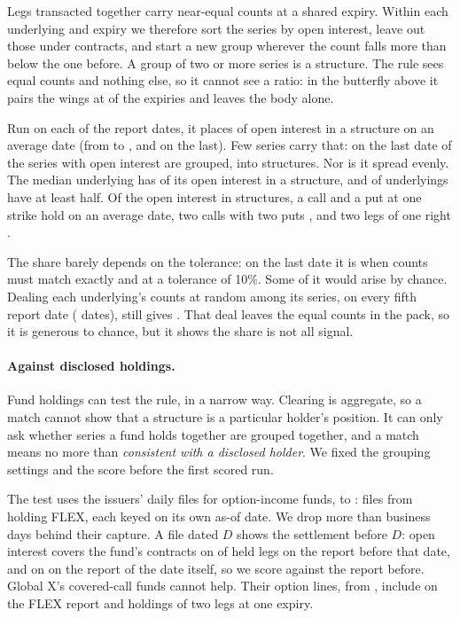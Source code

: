 \documentclass[11pt]{article}
\begin{document}
Legs transacted together carry near-equal counts at a shared expiry. Within each underlying
and expiry we therefore sort the series by open interest, leave out those under
\PosMinContracts{} contracts, and start a new group wherever the count falls more than
\PosTolerance{} below the one before. A group of two or more series is a structure. The rule
sees equal counts and nothing else, so it cannot see a ratio: in the butterfly above it pairs
the wings at \PosButterflyGrouped{} of the \PosButterflyExpiries{} expiries and leaves the
body alone.

Run on each of the \PosDates{} report dates, it places \PosStructuredMean{} of open interest
in a structure on an average date (from \PosStructuredMin{} to \PosStructuredMax{}, and
\PosStructuredLast{} on the last). Few series carry that: on the last date \PosGroupedLast{} of
the \PosSeriesLast{} series with open interest are grouped, into \PosStructuresLast{}
structures. Nor is it spread evenly. The median underlying has \PosMedianStructured{} of its
open interest in a structure, and \PosHalfStructured{} of underlyings have at least half.
Of the open interest in structures, a call and a put at one strike hold \PosShareSynthetic{}
on an average date, two calls with two puts \PosShareFour{}, and two legs of one right
\PosShareVertical{}.

The share barely depends on the tolerance: on the last date it is \PosToleranceExact{} when
counts must match exactly and \PosToleranceWide{} at a tolerance of 10\%. Some of it would
arise by chance. Dealing each underlying's counts at random among its series, on every fifth
report date (\PosChanceDates{} dates), still gives \PosChance{}. That deal leaves the equal
counts in the pack, so it is generous to chance, but it shows the share is not all signal.

\paragraph{Against disclosed holdings.} Fund holdings can test the rule, in a narrow way.
Clearing is aggregate, so a match cannot show that a structure is a particular holder's
position. It can only ask whether series a fund holds together are grouped together, and a
match means no more than \emph{consistent with a disclosed holder}. We fixed the grouping
settings and the score before the first scored run.

The test uses the issuers' daily files for option-income funds, \PosFirstAsOf{} to
\PosLastAsOf{}: \PosFiles{} files from \PosHoldingFunds{} holding FLEX, each keyed on its own
as-of date. We drop \PosStaleFiles{} more than \PosStaleBdays{} business days behind their
capture. A file dated $D$ shows the settlement before $D$: open interest covers the fund's
contracts on \PosFloorPrevious{} of \PosFloorLegs{} held legs on the report before that date,
and on \PosFloorSame{} on the report of the date itself, so we score against the report
before. Global X's covered-call funds cannot help. Their \PosGlobalxLegs{} option lines, from
\PosGlobalxFunds{}, include \PosGlobalxOnReport{} on the FLEX report and \PosGlobalxMulti{}
holdings of two legs at one expiry.
\end{document}
